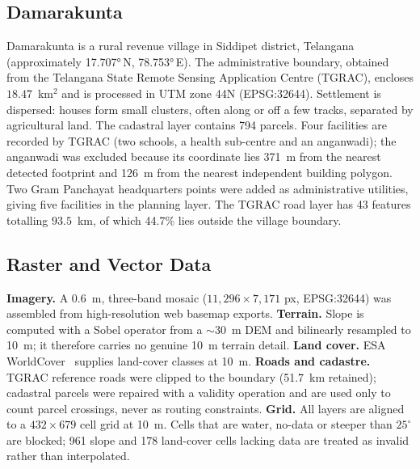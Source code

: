 \documentclass[journal]{IEEEtran}
\begin{document}
\subsection{Damarakunta}
Damarakunta is a rural revenue village in Siddipet district, Telangana (approximately \ang{17.707}\,N, \ang{78.753}\,E). The administrative boundary, obtained from the Telangana State Remote Sensing Application Centre (TGRAC), encloses $18.47$~km$^2$ and is processed in UTM zone 44N (EPSG:32644). Settlement is dispersed: houses form small clusters, often along or off a few tracks, separated by agricultural land. The cadastral layer contains 794 parcels. Four facilities are recorded by TGRAC (two schools, a health sub-centre and an anganwadi); the anganwadi was excluded because its coordinate lies 371~m from the nearest detected footprint and 126~m from the nearest independent building polygon. Two Gram Panchayat headquarters points were added as administrative utilities, giving five facilities in the planning layer. The TGRAC road layer has 43 features totalling $93.5$~km, of which 44.7\% lies outside the village boundary.

\subsection{Raster and Vector Data}
\textbf{Imagery.} A $0.6$~m, three-band mosaic ($11{,}296 \times 7{,}171$ px, EPSG:32644) was assembled from high-resolution web basemap exports. \textbf{Terrain.} Slope is computed with a Sobel operator from a $\sim$30~m DEM and bilinearly resampled to 10~m; it therefore carries no genuine 10~m terrain detail. \textbf{Land cover.} ESA WorldCover~\cite{zanaga2021worldcover} supplies land-cover classes at 10~m. \textbf{Roads and cadastre.} TGRAC reference roads were clipped to the boundary (51.7~km retained); cadastral parcels were repaired with a validity operation and are used only to count parcel crossings, never as routing constraints. \textbf{Grid.} All layers are aligned to a $432 \times 679$ cell grid at 10~m. Cells that are water, no-data or steeper than $25^\circ$ are blocked; 961 slope and 178 land-cover cells lacking data are treated as invalid rather than interpolated.
\end{document}

